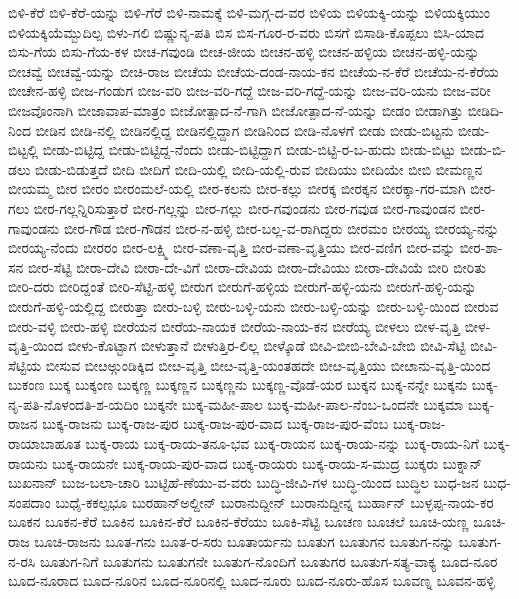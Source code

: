 ಬಿಳಿ-ಕೆರೆ
ಬಿಳಿ-ಕೆರೆ-ಯನ್ನು
ಬಿಳಿ-ಗೆರೆ
ಬಿಳಿ-ನಾಮಕ್ಕೆ
ಬಿಳಿ-ಮಗ್ಗ-ದ-ವರ
ಬಿಳಿಯ
ಬಿಳಿಯಕ್ಕಿ-ಯನ್ನು
ಬಿಳಿಯಕ್ಕಿಯುಂ
ಬಿಳಿಯಕ್ಕಿಯೆಮ್ಬುದಿಲ್ಪ
ಬಿಳು-ಗಲಿ
ಬಿಷ್ಣುನೃ-ಪತಿ
ಬಿಸ
ಬಿಸ-ಗೂರ-ರ-ವರು
ಬಿಸಗೆ
ಬಿಸಾಡಿ-ಕೊಪ್ಪಲು
ಬಿಸಿ-ಯಾದ
ಬಿಸು-ಗೆಯ
ಬಿಸು-ಗೆಯ-ಕಳ
ಬೀಚ-ಗವುಂಡಿ
ಬೀಚ-ಜೀಯ
ಬೀಚನ-ಹಳ್ಳಿ
ಬೀಚನ-ಹಳ್ಳಿಯ
ಬೀಚನ-ಹಳ್ಳಿ-ಯನ್ನು
ಬೀಚವ್ವೆ
ಬೀಚವ್ವೆ-ಯನ್ನು
ಬೀಚಿ-ರಾಜ
ಬೀಚೆಯ
ಬೀಚೆಯ-ದಂಡ-ನಾಯ-ಕನ
ಬೀಚೆಯ-ನ-ಕೆರೆ
ಬೀಚೆಯ-ನ-ಕೆರೆಯ
ಬೀಚೇನ-ಹಳ್ಳಿ
ಬೀಜ-ಗಂಡುಗ
ಬೀಜ-ವರಿ
ಬೀಜ-ವರಿ-ಗದ್ದೆ
ಬೀಜ-ವರಿ-ಗದ್ದೆ-ಯನ್ನು
ಬೀಜ-ವರಿ-ಯನು
ಬೀಜ-ವರೀ
ಬೀಜವೊಂನಾಗಿ
ಬೀಜಾವಾಪ-ಮಾತ್ರಂ
ಬೀಜೋತ್ಪಾದ-ನೆ-ಗಾಗಿ
ಬೀಜೋತ್ಪಾದ-ನೆ-ಯನ್ನು
ಬೀಡಂ
ಬೀಡಾಗಿತ್ತು
ಬೀಡಿದಿ-ನಿಂದ
ಬೀಡಿನ
ಬೀಡಿ-ನಲ್ಲಿ
ಬೀಡಿನಲ್ಲಿದ್ದ
ಬೀಡಿನಲ್ಲಿದ್ದಾಗ
ಬೀಡಿನಿಂದ
ಬೀಡಿ-ನೊಳಗೆ
ಬೀಡು
ಬೀಡು-ಬಿಟ್ಟನು
ಬೀಡು-ಬಿಟ್ಟಲ್ಲಿ
ಬೀಡು-ಬಿಟ್ಟಿದ್ದ
ಬೀಡು-ಬಿಟ್ಟಿದ್ದ-ನೆಂದು
ಬೀಡು-ಬಿಟ್ಟಿದ್ದಾಗ
ಬೀಡು-ಬಿಟ್ಟಿ-ರ-ಬ-ಹುದು
ಬೀಡು-ಬಿಟ್ಟು
ಬೀಡು-ಬಿ-ಡಲು
ಬೀಡು-ಬಿಡುತ್ತದೆ
ಬೀದಿ
ಬೀದಿಗೆ
ಬೀದಿ-ಯಲ್ಲಿ
ಬೀದಿ-ಯಲ್ಲಿ-ರುವ
ಬೀದಿಯು
ಬೀದಿಯೇ
ಬೀಬಿ
ಬೀಮಣ್ಣನ
ಬೀಯಮ್ಮ
ಬೀರ
ಬೀರಂ
ಬೀರಂಮಲೆ-ಯಲ್ಲಿ
ಬೀರ-ಕಲನು
ಬೀರ-ಕಲ್ಲು
ಬೀರಕ್ಕ
ಬೀರಕ್ಕನ
ಬೀರಕ್ಕಾ-ಗರ-ಮಾಗಿ
ಬೀರ-ಗಲು
ಬೀರ-ಗಲ್ಲನ್ನಿರಿಸುತ್ತಾರೆ
ಬೀರ-ಗಲ್ಲನ್ನು
ಬೀರ-ಗಲ್ಲು
ಬೀರ-ಗವುಂಡನು
ಬೀರ-ಗವುಡ
ಬೀರ-ಗಾವುಂಡನ
ಬೀರ-ಗಾವುಂಡನು
ಬೀರ-ಗೌಡ
ಬೀರ-ಗೌಡನ
ಬೀರ-ನ-ಹಳ್ಳಿ
ಬೀರ-ಬಲ್ಲ-ವ-ರಾಗಿದ್ದರು
ಬೀರಮಂ
ಬೀರಯ್ಯ
ಬೀರಯ್ಯ-ನನ್ನು
ಬೀರಯ್ಯ-ನೆಂದು
ಬೀರರಂ
ಬೀರ-ಲಕ್ಷ್ಮಿ
ಬೀರ-ವಣಾ-ವೃತ್ತಿ
ಬೀರ-ವಣಾ-ವೃತ್ತಿಯು
ಬೀರ-ವಣಿಗ
ಬೀರ-ವನ್ನು
ಬೀರ-ಶಾ-ಸನ
ಬೀರ-ಸೆಟ್ಟಿ
ಬೀರಾ-ದೇವಿ
ಬೀರಾ-ದೇ-ವಿಗೆ
ಬೀರಾ-ದೇವಿಯ
ಬೀರಾ-ದೇವಿಯು
ಬೀರಾ-ದೇವಿಯೆ
ಬೀರಿ
ಬೀರಿತು
ಬೀರಿ-ದರು
ಬೀರಿದ್ದಂತೆ
ಬೀರಿ-ಸೆಟ್ಟಿ-ಹಳ್ಳಿ
ಬೀರುಗ
ಬೀರುಗೆ-ಹಳ್ಳಿಯ
ಬೀರುಗೆ-ಹಳ್ಳಿ-ಯನು
ಬೀರುಗೆ-ಹಳ್ಳಿ-ಯನ್ನು
ಬೀರುಗೆ-ಹಳ್ಳಿ-ಯಲ್ಲಿದ್ದ
ಬೀರುತ್ತಾ
ಬೀರು-ಬಳ್ಳಿ
ಬೀರು-ಬಳ್ಳಿ-ಯನು
ಬೀರು-ಬಳ್ಳಿ-ಯನ್ನು
ಬೀರು-ಬಳ್ಳಿ-ಯಿಂದ
ಬೀರುವ
ಬೀರು-ವಳ್ಳಿ
ಬೀರು-ಹಳ್ಳಿ
ಬೀರೆಯನ
ಬೀರೆಯ-ನಾಯಕ
ಬೀರೆಯ-ನಾಯ-ಕನ
ಬೀರೆಯ್ಯ
ಬೀಳಲು
ಬೀಳ-ವೃತ್ತಿ
ಬೀಳ-ವೃತ್ತಿ-ಯಿಂದ
ಬೀಳು-ಕೊಟ್ಟಾಗ
ಬೀಳುತ್ತಾನೆ
ಬೀಳುತ್ತಿರ-ಲಿಲ್ಲ
ಬೀಳ್ಕೊಡೆ
ಬೀವಿ-ಬೀಬಿ-ಬೇವಿ-ಬೇಬಿ
ಬೀವಿ-ಸೆಟ್ಟಿ
ಬೀವಿ-ಸೆಟ್ಟಿಯ
ಬೀಸುವ
ಬೀೞಅ್ಗುಂಡಿಕ್ಕಿದ
ಬೀೞ-ವೃತ್ತಿ
ಬೀೞ-ವೃತ್ತಿ-ಯಂತಹದೇ
ಬೀೞ-ವೃತ್ತಿಯು
ಬೀೞಾನು-ವೃತ್ತಿ-ಯಿಂದ
ಬುಕಂಣ
ಬುಕ್ಕ
ಬುಕ್ಕಂಣ
ಬುಕ್ಕಣ್ಣ
ಬುಕ್ಕಣ್ಣನ
ಬುಕ್ಕಣ್ಣನು
ಬುಕ್ಕಣ್ಣ-ವೊಡೆ-ಯರ
ಬುಕ್ಕನ
ಬುಕ್ಕ-ನನ್ನೇ
ಬುಕ್ಕನು
ಬುಕ್ಕ-ನೃ-ಪತಿ-ನೊಳಂದತಿ-ಶ-ಯದಿಂ
ಬುಕ್ಕನೇ
ಬುಕ್ಕ-ಮಹೀ-ಪಾಲ
ಬುಕ್ಕ-ಮಹೀ-ಪಾಲ-ನೆಂಬ-ಒಂದನೇ
ಬುಕ್ಕಮಾ
ಬುಕ್ಕ-ರಾಜನ
ಬುಕ್ಕ-ರಾಜನು
ಬುಕ್ಕ-ರಾಜ-ಪುರ
ಬುಕ್ಕ-ರಾಜ-ಪುರ-ವಾದ
ಬುಕ್ಕ-ರಾಜ-ಪುರ-ವೆಂಬ
ಬುಕ್ಕ-ರಾಜ-ರಾಯಾಬಾಹೂತ
ಬುಕ್ಕ-ರಾಯ
ಬುಕ್ಕ-ರಾಯ-ತನೂ-ಭವ
ಬುಕ್ಕ-ರಾಯನ
ಬುಕ್ಕ-ರಾಯ-ನನ್ನು
ಬುಕ್ಕ-ರಾಯ-ನಿಗೆ
ಬುಕ್ಕ-ರಾಯನು
ಬುಕ್ಕ-ರಾಯನೇ
ಬುಕ್ಕ-ರಾಯ-ಪುರ-ವಾದ
ಬುಕ್ಕ-ರಾಯರು
ಬುಕ್ಕ-ರಾಯ-ಸ-ಮುದ್ರ
ಬುಕ್ಕರು
ಬುಕ್ನಾನ್
ಬುಖನಾನ್
ಬುಜ-ಬಲಾ-ಚಾರಿ
ಬುಟ್ಟಿಹೆ-ಣೆಯು-ವ-ವರು
ಬುದ್ಧಿ-ಜೀವಿ-ಗಳ
ಬುದ್ಧಿ-ಯಿಂದ
ಬುದ್ಧಿಲ
ಬುಧ-ಜನ
ಬುಧ-ಸಂಪದಾಂ
ಬುಧೈ-ಕಕಲ್ಪಭೂ
ಬುರಹಾನ್ಅಲ್ದೀನ್
ಬುರಾನುದ್ದೀನ್
ಬುರಾನುದ್ದೀನ್ನ
ಬುರ್ಹಾನ್
ಬುಳ್ಳಪ್ಪ-ನಾಯ-ಕರ
ಬೂಕನ
ಬೂಕನ-ಕೆರೆ
ಬೂಕಿನ
ಬೂಕಿನ-ಕೆರೆ
ಬೂಕಿನ-ಕೆರೆಯು
ಬೂಕಿ-ಸೆಟ್ಟಿ
ಬೂಚಣ
ಬೂಚಲೆ
ಬೂಚಿ-ಯಣ್ಣ
ಬೂಚಿ-ರಾಜ
ಬೂಚಿ-ರಾಜನು
ಬೂತ-ಗನು
ಬೂತ-ರ-ಸರು
ಬೂತಾರ್ಯನು
ಬೂತುಗ
ಬೂತುಗನ
ಬೂತುಗ-ನನ್ನು
ಬೂತುಗ-ನ-ರಸಿ
ಬೂತುಗ-ನಿಗೆ
ಬೂತುಗನು
ಬೂತುಗನೇ
ಬೂತುಗ-ನೊಂದಿಗೆ
ಬೂತುಗರ
ಬೂತುಗ-ಸತ್ಯ-ವಾಕ್ಯ
ಬೂದ-ನೂರ
ಬೂದ-ನೂರಾದ
ಬೂದ-ನೂರಿನ
ಬೂದ-ನೂರಿನಲ್ಲಿ
ಬೂದ-ನೂರು
ಬೂದ-ನೂರು-ಹೊಸ
ಬೂವಣ್ನ
ಬೂವನ-ಹಳ್ಳಿ
